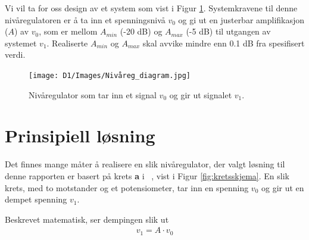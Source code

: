 \documentclass[a4paper,11pt,norsk]{article}
\begin{document}
Vi vil ta for oss design av et system som vist i Figur \ref{fig:diagram}. Systemkravene til denne nivåregulatoren er å ta inn et spenningsnivå $v_0$ og gi ut en justerbar amplifikasjon ($A$) av $v_0$, som er mellom $A_{min}$ (-20 dB) og $A_{max}$ (-5 dB) til utgangen av systemet $v_1$. Realiserte $A_{min}$ og $A_{max}$ skal avvike mindre enn 0.1 dB fra spesifisert verdi. 

\begin{figure}[H]
  \centering
  \texttt{[image: D1/Images/Nivåreg\_diagram.jpg]}
  \caption{Nivåregulator som tar inn et signal $v_0$ og gir ut signalet $v_1$.}
  \label{fig:diagram}
\end{figure}

\section{Prinsipiell løsning}
\label{sec:prinsipielllosning}
Det finnes mange måter å realisere en slik nivåregulator, der valgt løsning til denne rapporten er basert på krets \textbf{a} i ~\cite[Figur 3, s. 2)]{notat}, vist i Figur \ref{fig:kretsskjema}. En slik krets, med to motstander og et potensiometer, tar inn en spenning $v_0$ og gir ut en dempet spenning $v_1$. 

Beskrevet matematisk, ser dempingen slik ut 
\begingroup
\Large
\begin{align*}
  v_1 = A \cdot v_0 \label{eq:utgangspunkt}
\end{align*}
\endgroup
\end{document}
